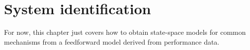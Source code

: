 
\chapter{System identification}

For now, this chapter just covers how to obtain state-space models for common
mechanisms from a feedforward model derived from performance data.

\renewcommand*{\chapterpath}{\partpath/system-identification}


